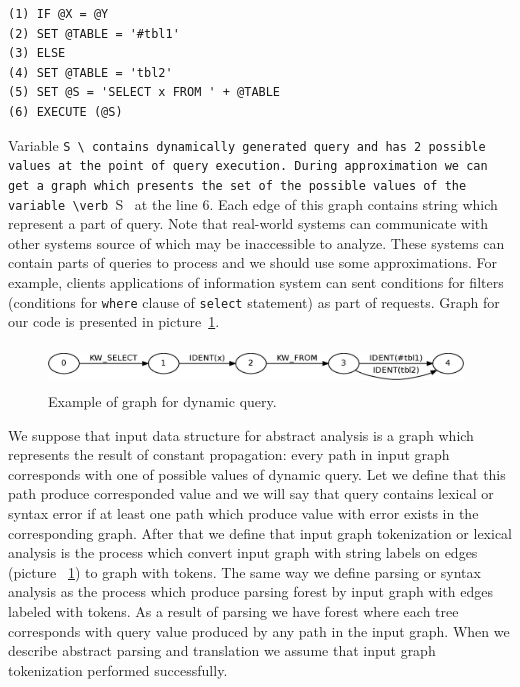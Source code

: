 \documentclass{llncs}
\begin{document}
\begin{verbatim} 
(1) IF @X = @Y
(2) SET @TABLE = '#tbl1'
(3) ELSE
(4) SET @TABLE = 'tbl2'
(5) SET @S = 'SELECT x FROM ' + @TABLE
(6) EXECUTE (@S)
\end{verbatim}

Variable \verb @S \ contains dynamically generated query and has 2 possible values at the point of query execution. During approximation we can get a graph which presents the set of the possible values of the variable \verb @S \ at the line 6. Each edge of this graph contains string which represent a part of query. Note that real-world systems can communicate with other systems source of which may be inaccessible to analyze. These systems can contain parts of queries to process and we should use some approximations. For example, clients applications of information system can sent conditions for filters (conditions for \verb|where| clause of \verb|select| statement) as part of requests.  Graph for our code is presented in picture~\ref{pic1}.

\begin{figure}
    \begin{center}
        \includegraphics[width=11cm,height=1.1cm]{graphs/simple_sql.eps}
        \caption{Example of graph for dynamic query.}
        \label{pic1}        
    \end{center}
\end{figure}

We suppose that input data structure for abstract analysis is a graph which represents the result of constant propagation: every path in input graph corresponds with one of possible values of dynamic query. Let we define that this path produce corresponded value and we will say that query contains lexical or syntax error if at least one path which produce value with error exists in the corresponding graph. After that we define that input graph tokenization or lexical analysis is the process which convert input graph with string labels on edges (picture ~\ref{pic1}) to graph with tokens. The same way we define parsing or syntax analysis as the process which produce parsing forest by input graph with edges labeled with tokens.  As a result of parsing we have forest where each tree corresponds with query value produced by any path in the input graph. When we describe abstract parsing and translation we assume that input graph tokenization performed successfully.
\end{document}
